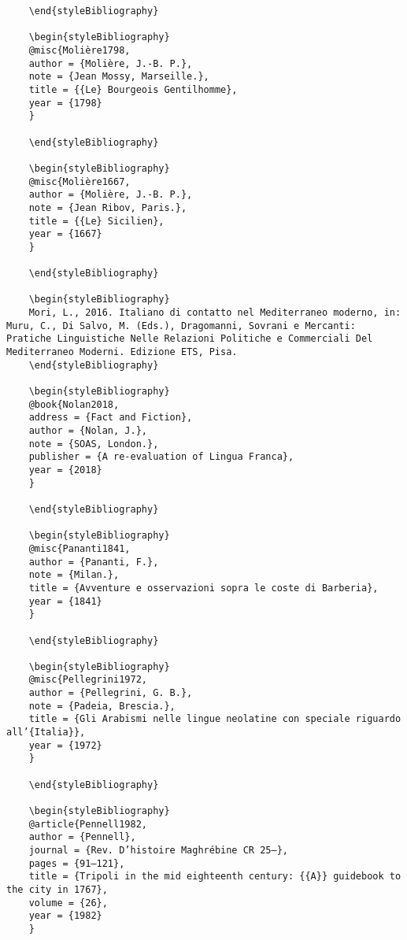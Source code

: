 \documentclass[output=paper]{langsci/langscibook}
\begin{document}
\begin{stylelsUnNumberedSection}
\begin{verbatim}
	\end{styleBibliography}
	
	\begin{styleBibliography}
	@misc{Molière1798,
	author = {Molière, J.-B. P.},
	note = {Jean Mossy, Marseille.},
	title = {{Le} Bourgeois Gentilhomme},
	year = {1798}
	}
	
	\end{styleBibliography}
	
	\begin{styleBibliography}
	@misc{Molière1667,
	author = {Molière, J.-B. P.},
	note = {Jean Ribov, Paris.},
	title = {{Le} Sicilien},
	year = {1667}
	}
	
	\end{styleBibliography}
	
	\begin{styleBibliography}
	Mori, L., 2016. Italiano di contatto nel Mediterraneo moderno, in: Muru, C., Di Salvo, M. (Eds.), Dragomanni, Sovrani e Mercanti: Pratiche Linguistiche Nelle Relazioni Politiche e Commerciali Del Mediterraneo Moderni. Edizione ETS, Pisa.
	\end{styleBibliography}
	
	\begin{styleBibliography}
	@book{Nolan2018,
	address = {Fact and Fiction},
	author = {Nolan, J.},
	note = {SOAS, London.},
	publisher = {A re-evaluation of Lingua Franca},
	year = {2018}
	}
	
	\end{styleBibliography}
	
	\begin{styleBibliography}
	@misc{Pananti1841,
	author = {Pananti, F.},
	note = {Milan.},
	title = {Avventure e osservazioni sopra le coste di Barberia},
	year = {1841}
	}
	
	\end{styleBibliography}
	
	\begin{styleBibliography}
	@misc{Pellegrini1972,
	author = {Pellegrini, G. B.},
	note = {Padeia, Brescia.},
	title = {Gli Arabismi nelle lingue neolatine con speciale riguardo all’{Italia}},
	year = {1972}
	}
	
	\end{styleBibliography}
	
	\begin{styleBibliography}
	@article{Pennell1982,
	author = {Pennell},
	journal = {Rev. D’histoire Maghrébine CR 25–},
	pages = {91–121},
	title = {Tripoli in the mid eighteenth century: {{A}} guidebook to the city in 1767},
	volume = {26},
	year = {1982}
	}
	

\end{verbatim}
\end{stylelsUnNumberedSection}
\end{document}
